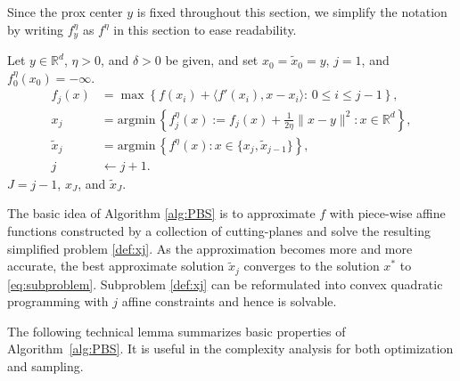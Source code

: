 \documentclass[11pt,letterpaper]{article}
\newcommand{\chen}{\color{cyan}}
\newcommand{\nn}{\nonumber}
\newcommand{\R}{\mathbb{R}}
\newcommand{\inner}[2]{\langle #1,#2\rangle}
\newcommand{\argmin}{\mathrm{argmin}\,}
\newcommand{\tx}{\tilde x}
\begin{document}
Since the prox center $y$ is fixed throughout this section, we simplify the notation by writing $f_y^\eta$ as $f^\eta$ in this section to ease readability.

\begin{algorithm}[H]
	\caption{Regularized Cutting-plane Method} %
	\label{alg:PBS}
	\begin{algorithmic}
        \REQUIRE Let $y\in \R^d$, $\eta>0$, and $\delta>0$ be given, and set $x_0=\tx_0=y$, $j=1$, and $f_0^\eta(x_0)=-\infty$.
        \WHILE{$f^\eta(\tx_{j-1}) - f_{j-1}^\eta(x_{j-1}) > \delta$}
        \STATE 
        \vspace{-5mm}
        \begin{align}
            f_j(x) &= \max \left\lbrace  f(x_i)+\inner{f'(x_i)}{x-x_i} : \, 0\le i\le j-1\right\rbrace, \label{eq:fj} \\
            x_j &=\argmin
	        \left\lbrace f_j^\eta(x):= f_j(x) +\frac{1}{2\eta}\|x- y\|^2 : x\in  \R^d \right\rbrace, \label{def:xj} \\
            \tx_j &= \argmin\left\lbrace f^\eta(x): x\in \{x_j, \tx_{j-1}\}\right\rbrace, \label{def:tx} \\
            j &\gets j + 1. \nn
        \end{align}
        \vspace{-5mm}
        \ENDWHILE
        \RETURN $J=j-1$, $x_J$, and $\tilde x_J$.
	\end{algorithmic}
\end{algorithm}

The basic idea of Algorithm \ref{alg:PBS} is to approximate $f$ with piece-wise affine functions constructed by a collection of cutting-planes and solve the resulting simplified problem \eqref{def:xj}. As the approximation becomes more and more accurate, the best approximate solution $\tx_j$ converges to the solution $x^*$ to \eqref{eq:subproblem}.
Subproblem \eqref{def:xj} can be reformulated into convex quadratic programming with $j$ affine constraints and hence is solvable.

The following technical lemma summarizes basic properties of Algorithm~\ref{alg:PBS}. It is useful in the complexity analysis for both optimization and sampling.
\end{document}
